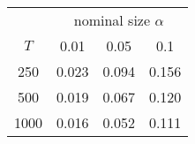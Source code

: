 % 
\begin{tabular}{cccc}
  \hline
  & \multicolumn{3}{c}{nominal size $\alpha$} \\
 $T$ & 0.01 & 0.05 & 0.1 \\
 \hline
250 & 0.023 & 0.094 & 0.156 \\ 
  500 & 0.019 & 0.067 & 0.120 \\ 
  1000 & 0.016 & 0.052 & 0.111 \\ 
   \hline
\end{tabular}
